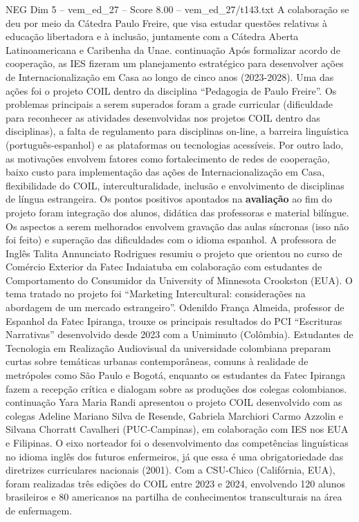 \begin{textsample}{NEG Dim 5 – vem\_ed\_27 – Score 8.00 – vem\_ed\_27/t143.txt}
A colaboração se deu por meio da Cátedra Paulo Freire, que visa estudar questões relativas à educação libertadora e à inclusão, juntamente com a Cátedra Aberta Latinoamericana e Caribenha da Unae. continuação Após formalizar acordo de cooperação, as IES fizeram um planejamento estratégico para desenvolver ações de Internacionalização em Casa ao longo de cinco anos (2023-2028).
Uma das ações foi o projeto COIL dentro da disciplina “Pedagogia de Paulo Freire”.
Os problemas principais a serem superados foram a grade curricular (dificuldade para reconhecer as atividades desenvolvidas nos projetos COIL dentro das disciplinas), a falta de regulamento para disciplinas on-line, a barreira linguística (português-espanhol) e as plataformas ou tecnologias acessíveis.
Por outro lado, as motivações envolvem fatores como fortalecimento de redes de cooperação, baixo custo para implementação das ações de Internacionalização em Casa, flexibilidade do COIL, interculturalidade, inclusão e envolvimento de disciplinas de língua estrangeira.
Os pontos positivos apontados na \textbf{avaliação} ao fim do projeto foram integração dos alunos, didática das professoras e material bilíngue.
Os aspectos a serem melhorados envolvem gravação das aulas síncronas (isso não foi feito) e superação das dificuldades com o idioma espanhol.
A professora de Inglês Talita Annunciato Rodrigues resumiu o projeto que orientou no curso de Comércio Exterior da Fatec Indaiatuba em colaboração com estudantes de Comportamento do Consumidor da University of Minnesota Crookston (EUA).
O tema tratado no projeto foi “Marketing Intercultural: considerações na abordagem de um mercado estrangeiro”.
Odenildo França Almeida, professor de Espanhol da Fatec Ipiranga, trouxe os principais resultados do PCI “Escrituras Narrativas” desenvolvido desde 2023 com a Uniminuto (Colômbia).
Estudantes de Tecnologia em Realização Audiovisual da universidade colombiana preparam curtas sobre temáticas urbanas contemporâneas, comuns à realidade de metrópoles como São Paulo e Bogotá, enquanto os estudantes da Fatec Ipiranga fazem a recepção crítica e dialogam sobre as produções dos colegas colombianos. continuação Yara Maria Randi apresentou o projeto COIL desenvolvido com as colegas Adeline Mariano Silva de Resende, Gabriela Marchiori Carmo Azzolin e Silvana Chorratt Cavalheri (PUC-Campinas), em colaboração com IES nos EUA e Filipinas.
O eixo norteador foi o desenvolvimento das competências linguísticas no idioma inglês dos futuros enfermeiros, já que essa é uma obrigatoriedade das diretrizes curriculares nacionais (2001).
Com a CSU-Chico (Califórnia, EUA), foram realizadas três edições do COIL entre 2023 e 2024, envolvendo 120 alunos brasileiros e 80 americanos na partilha de conhecimentos transculturais na área de enfermagem.

\end{textsample}
